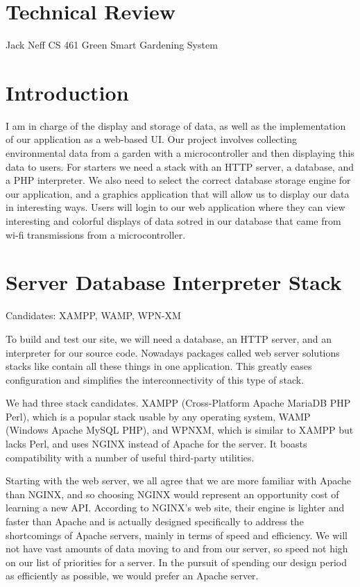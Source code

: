 \documentclass[letterpaper,10pt,titlepage]{article}
\begin{document}
\section{Technical Review}
	Jack Neff
	CS 461
	Green Smart Gardening System

\section{Introduction}
	
I am in charge of the display and storage of data, as well as the implementation of our application as a web-based UI. Our project involves collecting environmental data from a garden with a microcontroller and then displaying this data to users. For starters we need a stack with an HTTP server, a database, and a PHP interpreter. We also need to select the correct database storage engine for our application, and a graphics application that will allow us to display our data in interesting ways. Users will login to our web application where they can view interesting and colorful displays of data sotred in our database that came from wi-fi transmissions from a microcontroller. 


\section{Server Database Interpreter Stack}

Candidates: XAMPP, WAMP, WPN-XM

To build and test our site, we will need a database, an HTTP server, and an interpreter for our source code. Nowadays packages called web server solutions stacks like contain all these things in one application. This greatly eases configuration and simplifies the interconnectivity of this type of stack. 

We had three stack candidates. XAMPP (Cross-Platform Apache MariaDB PHP Perl), which is a popular stack usable by any operating system, WAMP (Windows Apache MySQL PHP), and WPNXM, which is similar to XAMPP but lacks Perl, and uses NGINX instead of Apache for the server. It boasts compatibility with a number of useful third-party utilities. 

Starting with the web server, we all agree that we are more familiar with Apache than NGINX, and so choosing NGINX would represent an opportunity cost of learning a new API. According to NGINX’s web site, their engine is lighter and faster than Apache and is actually designed specifically to address the shortcomings of Apache servers, mainly in terms of speed and efficiency. We will not have vast amounts of data moving to and from our server, so speed not high on our list of priorities for a server. In the pursuit of spending our design period as efficiently as possible, we would prefer an Apache server. 
\end{document}
